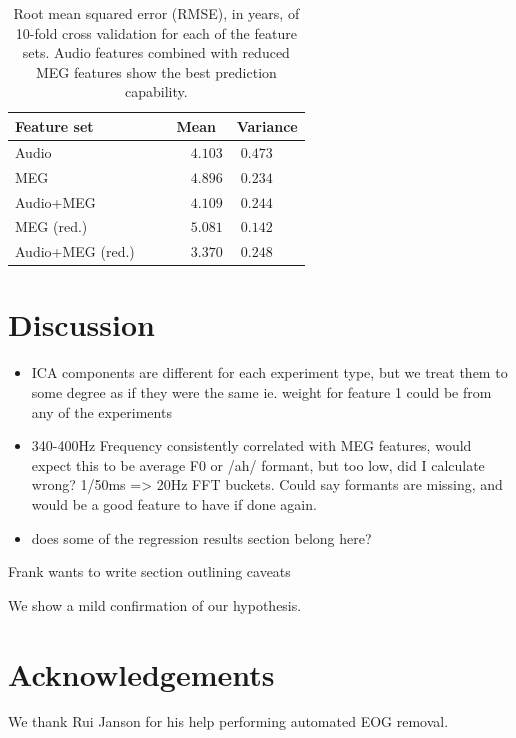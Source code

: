 \documentclass[a4paper]{article}
\begin{document}
\begin{table}[t]
  \caption{Root mean squared error (RMSE), in years, of 10-fold cross validation for each of the feature sets. Audio features combined with reduced MEG features show the best prediction capability.}
  \label{tab:rmse}
  \centering
  \begin{tabular}{ l@{}c  c }
    \toprule
    \multicolumn{1}{l}{\textbf{Feature set}} & \multicolumn{1}{c}{\textbf{Mean}} & \multicolumn{1}{c}{\textbf{Variance}} \\
    \midrule
    Audio~~~                             & ~~~$4.103$         &     $0.473$~~~       \\
    MEG~~~                               & ~~~$4.896$         &     $0.234$~~~       \\
    Audio+MEG~~~                         & ~~~$4.109$         &     $0.244$~~~       \\

    MEG (red.)~~~                        & ~~~$5.081$         &     $0.142$~~~       \\
    Audio+MEG (red.)~~~                  & ~~~$3.370$         &     $0.248$~~~       \\
    \bottomrule
  \end{tabular}
\end{table}

\section{Discussion}

\begin{itemize}
\item ICA components are different for each experiment type, but we treat them to some degree as if they were the same ie. weight for feature 1 could be from any of the experiments
\item 340-400Hz Frequency consistently correlated with MEG features, would expect this to be average F0 or /ah/ formant, but too low, did I calculate wrong? 1/50ms => 20Hz FFT buckets. Could say formants are missing, and would be a good feature to have if done again.
\item does some of the regression results section belong here?
\end{itemize}

Frank wants to write section outlining caveats

We show a mild confirmation of our hypothesis.

\section{Acknowledgements}

We thank Rui Janson for his help performing automated EOG removal.





\end{document}
